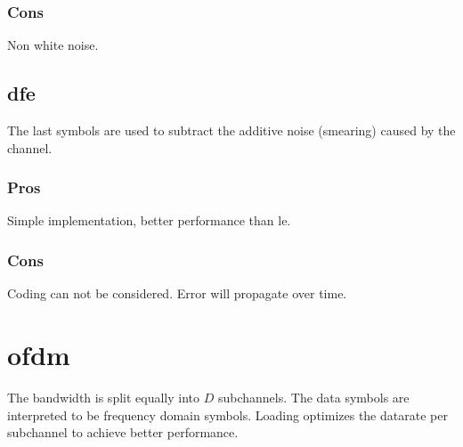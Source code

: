 \subsubsection{Cons}
Non white noise.


\subsection{\acl{dfe}}
The last symbols are used to subtract the additive noise (smearing) caused by the channel.

\subsubsection{Pros}
Simple implementation, better performance than \ac{le}.

\subsubsection{Cons}
Coding can not be considered. Error will propagate over time.

\section{\acl{ofdm}}
The bandwidth is split equally into $D$ subchannels. The data symbols are interpreted to be
frequency domain symbols. Loading optimizes the datarate per subchannel to achieve better
performance.
